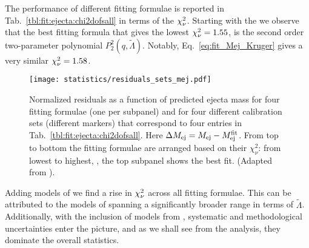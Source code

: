 The performance of different fitting formulae is reported in  
Tab.~\ref{tbl:fit:ejecta:chi2dofsall} in terms of the $\chi_{\nu}^2$.
%
Starting with the \DSrefset{} we observe that the best fitting formula that gives the 
lowest $\chi_{\nu}^2=1.55$, is the second order two-parameter polynomial $P_2^2(q,\tilde{\Lambda})$.
Notably, Eq.~\eqref{eq:fit_Mej_Kruger} gives a very similar $\chi_{\nu}^2=1.58$.
%
%
\begin{figure}[t!]
    \centering 
    \texttt{[image: statistics/residuals\_sets\_mej.pdf]}
    \caption{
        Normalized residuals as a function of predicted ejecta mass for 
        four fitting formulae (one per subpanel) and for four different 
        calibration sets (different markers) that correspond to four 
        entries in  Tab.~\ref{tbl:fit:ejecta:chi2dofsall}. 
        Here 
        $\Delta M_{\rm ej} = M_{\rm ej} - M^{\rm fit}_{\rm ej}$.
        From top to bottom the fitting formulae are arranged 
        based on their $\chi_{\nu}^2$: from lowest to highest, \ie, 
        the top subpanel shows the best fit.
        (Adapted from \citet{Nedora:2020qtd}).
    }
    \label{fig:ejecta:dyn:m}
\end{figure}
%
Adding models of \DSheatcool{} we find a rise in $\chi_{\nu}^2$ across all fitting formulae. 
This can be attributed to the models of \DSheatcool{} spanning a significantly broader range 
in terms of $\tilde{\Lambda}$. Additionally, with the inclusion of models from \DSheatcool{},
systematic and methodological uncertainties enter the picture, and as we shall see from 
the analysis, they dominate the overall statistics.

